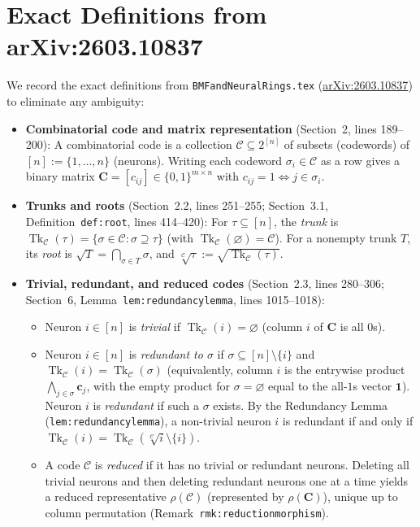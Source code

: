 \documentclass[11pt]{article}
\theoremstyle{plain}
\theoremstyle{definition}
\theoremstyle{remark}
\DeclareMathOperator{\Tk}{Tk}
\begin{document}
\section{Exact Definitions from arXiv:2603.10837}

We record the exact definitions from \texttt{BMFandNeuralRings.tex} (\href{https://arxiv.org/abs/2603.10837}{arXiv:2603.10837}) to eliminate any ambiguity:
\begin{itemize}[leftmargin=2em]
\item \textbf{Combinatorial code and matrix representation} (Section~2, lines 189--200): A combinatorial code is a collection $\mathcal{C} \subseteq 2^{[n]}$ of subsets (codewords) of $[n] := \{1, \dots, n\}$ (neurons). Writing each codeword $\sigma_i \in \mathcal{C}$ as a row gives a binary matrix $\mathbf{C} = [c_{ij}] \in \{0,1\}^{m \times n}$ with $c_{ij} = 1 \iff j \in \sigma_i$.
\item \textbf{Trunks and roots} (Section~2.2, lines 251--255; Section~3.1, Definition~\texttt{def:root}, lines 414--420): For $\tau \subseteq [n]$, the \emph{trunk} is $\Tk_{\mathcal{C}}(\tau) = \{\sigma \in \mathcal{C} : \sigma \supseteq \tau\}$ (with $\Tk_{\mathcal{C}}(\varnothing) = \mathcal{C}$). For a nonempty trunk $T$, its \emph{root} is $\sqrt{T} = \bigcap_{\sigma \in T} \sigma$, and $\sqrt[\mathcal{C}]{\tau} := \sqrt{\Tk_{\mathcal{C}}(\tau)}$.
\item \textbf{Trivial, redundant, and reduced codes} (Section~2.3, lines 280--306; Section~6, Lemma~\texttt{lem:\allowbreak redundancylemma}, lines 1015--1018):
  \begin{itemize}[leftmargin=1.5em]
  \item Neuron $i \in [n]$ is \emph{trivial} if $\Tk_{\mathcal{C}}(i) = \varnothing$ (column $i$ of $\mathbf{C}$ is all $0$s).
  \item Neuron $i \in [n]$ is \emph{redundant to $\sigma$} if $\sigma \subseteq [n] \setminus \{i\}$ and $\Tk_{\mathcal{C}}(i) = \Tk_{\mathcal{C}}(\sigma)$ (equivalently, column $i$ is the entrywise product $\bigwedge_{j \in \sigma} \mathbf{c}_j$, with the empty product for $\sigma = \varnothing$ equal to the all-$1$s vector $\mathbf{1}$). Neuron $i$ is \emph{redundant} if such a $\sigma$ exists. By the Redundancy Lemma (\texttt{lem:redundancylemma}), a non-trivial neuron $i$ is redundant if and only if $\Tk_{\mathcal{C}}(i) = \Tk_{\mathcal{C}}(\sqrt[\mathcal{C}]{i} \setminus \{i\})$.
  \item A code $\mathcal{C}$ is \emph{reduced} if it has no trivial or redundant neurons. Deleting all trivial neurons and then deleting redundant neurons one at a time yields a reduced representative $\rho(\mathcal{C})$ (represented by $\rho(\mathbf{C})$), unique up to column permutation (Remark~\texttt{rmk:reductionmorphism}).

\end{itemize}
\end{itemize}
\end{document}
